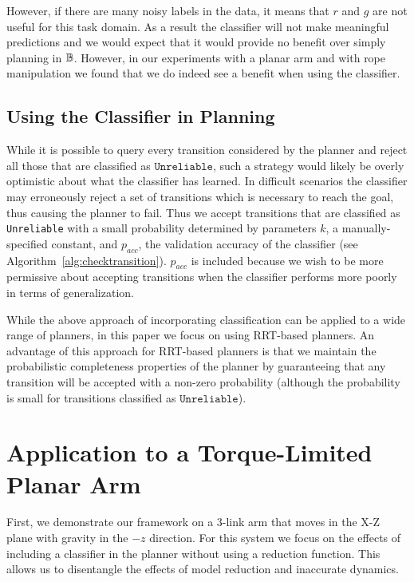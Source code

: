 However, if there are many noisy labels in the data, it means that $r$ and $g$ are not useful for this task domain. As a result the classifier will not make meaningful predictions and we would expect that it would provide no benefit over simply planning in $\mathbb{B}$. However, in our experiments with a planar arm and with rope manipulation we found that we do indeed see a benefit when using the classifier.


\subsection{Using the Classifier in Planning}

While it is possible to query every transition considered by the planner and reject all those that are classified as $\texttt{Unreliable}$, such a strategy would likely be overly optimistic about what the classifier has learned. In difficult scenarios the classifier may erroneously reject a set of transitions which is necessary to reach the goal, thus causing the planner to fail. Thus we accept transitions that are classified as \texttt{Unreliable} with a small probability determined by parameters $k$, a manually-specified constant, and $p_{acc}$, the validation accuracy of the classifier (see  Algorithm~\ref{alg:checktransition}). $p_{acc}$ is included because we wish to be more permissive about accepting transitions when the classifier performs more poorly in terms of generalization.

While the above approach of incorporating classification can be applied to a wide range of planners, in this paper we focus on using RRT-based planners. An advantage of this approach for RRT-based planners is that we maintain the probabilistic completeness properties of the planner by guaranteeing that any transition will be accepted with a non-zero probability (although the probability is small for transitions classified as $\texttt{Unreliable}$).




\section{Application to a Torque-Limited Planar Arm}

First, we demonstrate our framework on a 3-link arm that moves in the X-Z plane with gravity in the $-z$ direction. For this system we focus on the effects of including a classifier in the planner without using a reduction function. This allows us to disentangle the effects of model reduction and inaccurate dynamics. %

